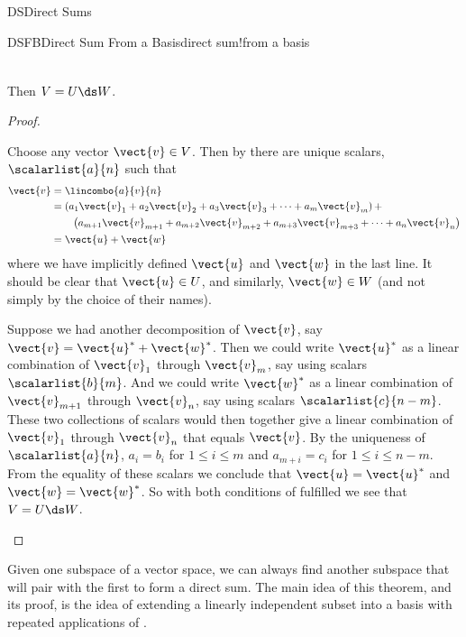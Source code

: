\begin{subsect}{DS}{Direct Sums}
\begin{theorem}{DSFB}{Direct Sum From a Basis}{direct sum!from a basis}
\begin{para}
\begin{align*}
\end{align*}
\end{para}
%
\begin{para}Then $V=U\ds W$.\end{para}
\end{theorem}
%
\begin{proof}
\begin{para}Choose any vector $\vect{v}\in V$.  Then by  there are unique scalars, $\scalarlist{a}{n}$ such that
%
\begin{align*}
\vect{v}
&=\lincombo{a}{v}{n}\\
&=\left(a_1\vect{v}_1+a_2\vect{v}_2+a_3\vect{v}_3+\dots+a_m\vect{v}_m\right)+\\
&\quad\quad\left(a_{m+1}\vect{v}_{m+1}+a_{m+2}\vect{v}_{m+2}+a_{m+3}\vect{v}_{m+3}+\dots+a_n\vect{v}_n\right)\\
&=\vect{u}+\vect{w}
\end{align*}
%
where we have implicitly defined $\vect{u}$ and $\vect{w}$ in the last line.  It should be clear that $\vect{u}\in{U}$, and similarly, $\vect{w}\in{W}$ (and not simply by the choice of their names).\end{para}
%
\begin{para}Suppose we had another decomposition of $\vect{v}$, say $\vect{v}=\vect{u}^\ast+\vect{w}^\ast$.  Then we could write $\vect{u}^\ast$ as a linear combination of $\vect{v}_1$ through $\vect{v}_m$, say using scalars $\scalarlist{b}{m}$.  And we could write $\vect{w}^\ast$ as a linear combination of $\vect{v}_{m+1}$ through $\vect{v}_n$, say using scalars $\scalarlist{c}{n-m}$.  These two collections of scalars would then together give a linear combination of $\vect{v}_1$ through $\vect{v}_n$  that  equals $\vect{v}$.  By the uniqueness of $\scalarlist{a}{n}$, $a_i=b_i$ for $1\leq i\leq m$ and $a_{m+i}=c_{i}$ for $1\leq i\leq n-m$.  From the equality of these scalars we conclude that $\vect{u}=\vect{u}^\ast$ and $\vect{w}=\vect{w}^\ast$.  So with both conditions of  fulfilled we see that $V=U\ds W$.\end{para}
\end{proof}
%
\begin{para}Given one subspace of a vector space, we can always find another subspace that will pair with the first to form a direct sum.  The main idea of this theorem, and its proof, is the idea of extending a linearly independent subset into a basis with repeated applications of .\end{para}

\end{subsect}
